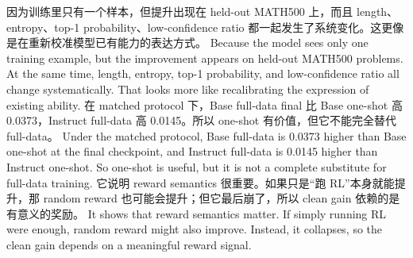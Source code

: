 {}\markdownRendererHorizontalRule{}\markdownRendererInterblockSeparator
{}\markdownRendererInterblockSeparator
{}\markdownRendererInterblockSeparator
{}\markdownRendererInterblockSeparator
{}因为训练里只有一个样本，但提升出现在 held-out MATH500 上，而且 length、entropy、top-1 probability、low-confidence ratio 都一起发生了系统变化。这更像是在重新校准模型已有能力的表达方式。\markdownRendererInterblockSeparator
{}\markdownRendererInterblockSeparator
{}Because the model sees only one training example, but the improvement appears on held-out MATH500 problems. At the same time, length, entropy, top-1 probability, and low-confidence ratio all change systematically. That looks more like recalibrating the expression of existing ability.\markdownRendererInterblockSeparator
{}\markdownRendererInterblockSeparator
{}\markdownRendererInterblockSeparator
{}在 matched protocol 下，Base full-data final 比 Base one-shot 高 0.0373，Instruct full-data 高 0.0145。所以 one-shot 有价值，但它不能完全替代 full-data。\markdownRendererInterblockSeparator
{}\markdownRendererInterblockSeparator
{}Under the matched protocol, Base full-data is 0.0373 higher than Base one-shot at the final checkpoint, and Instruct full-data is 0.0145 higher than Instruct one-shot. So one-shot is useful, but it is not a complete substitute for full-data training.\markdownRendererInterblockSeparator
{}\markdownRendererInterblockSeparator
{}\markdownRendererInterblockSeparator
{}它说明 reward semantics 很重要。如果只是“跑 RL”本身就能提升，那 random reward 也可能会提升；但它最后崩了，所以 clean gain 依赖的是有意义的奖励。\markdownRendererInterblockSeparator
{}\markdownRendererInterblockSeparator
{}It shows that reward semantics matter. If simply running RL were enough, random reward might also improve. Instead, it collapses, so the clean gain depends on a meaningful reward signal.\markdownRendererInterblockSeparator
